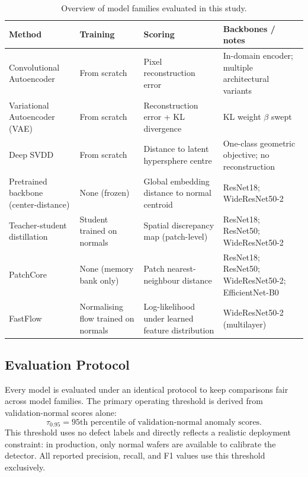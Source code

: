 \documentclass[11pt]{article}
\begin{document}
\begin{table}[H]
\centering
\caption{Overview of model families evaluated in this study.}
\label{tab:method_overview}
\begin{tabularx}{\linewidth}{>{\raggedright\arraybackslash}p{3.2cm}
                              >{\raggedright\arraybackslash}p{2.2cm}
                              >{\raggedright\arraybackslash}p{2.4cm}
                              >{\raggedright\arraybackslash}X}
\toprule
Method & Training & Scoring & Backbones / notes \\
\midrule
Convolutional Autoencoder
  & From scratch
  & Pixel reconstruction error
  & In-domain encoder; multiple architectural variants \\
Variational Autoencoder (VAE)
  & From scratch
  & Reconstruction error + KL divergence
  & KL weight $\beta$ swept \\
Deep SVDD
  & From scratch
  & Distance to latent hypersphere centre
  & One-class geometric objective; no reconstruction \\
\midrule
Pretrained backbone (center-distance)
  & None (frozen)
  & Global embedding distance to normal centroid
  & ResNet18; WideResNet50-2 \\
\midrule
Teacher-student distillation
  & Student trained on normals
  & Spatial discrepancy map (patch-level)
  & ResNet18; ResNet50; WideResNet50-2 \\
PatchCore
  & None (memory bank only)
  & Patch nearest-neighbour distance
  & ResNet18; ResNet50; WideResNet50-2; EfficientNet-B0 \\
FastFlow
  & Normalising flow trained on normals
  & Log-likelihood under learned feature distribution
  & WideResNet50-2 (multilayer) \\
\bottomrule
\end{tabularx}
\end{table}

\subsection{Evaluation Protocol}

Every model is evaluated under an identical protocol to keep comparisons fair
across model families. The primary operating threshold is derived from
validation-normal scores alone:
\[
  \tau_{0.95} = \text{95th percentile of validation-normal anomaly scores.}
\]
This threshold uses no defect labels and directly reflects a realistic
deployment constraint: in production, only normal wafers are available to
calibrate the detector. All reported precision, recall, and F1 values use
this threshold exclusively.
\end{document}
